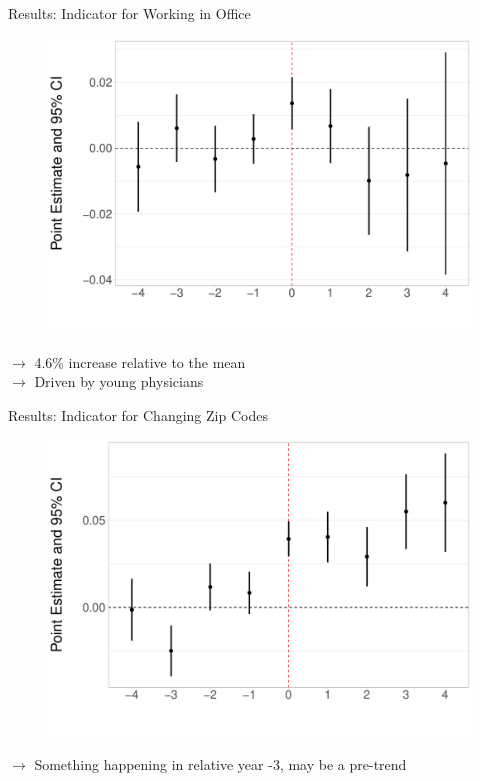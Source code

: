 \documentclass[10pt]{beamer}
\begin{document}
\begin{frame}{Results: Indicator for Working in Office}
\begin{figure}[ht]
    \centering
    \includegraphics[scale=.35]{Objects/Presentation_office_all.pdf}
\end{figure}
$\rightarrow$ 4.6\% increase relative to the mean\\
$\rightarrow$ Driven by young physicians
\end{frame}

\begin{frame}{Results: Indicator for Changing Zip Codes}
\begin{figure}[ht]
    \centering
    \includegraphics[scale=.35]{Objects/Presentation_zip_all.pdf}
\end{figure}
$\rightarrow$ Something happening in relative year -3, may be a pre-trend
\end{frame}
\end{document}

